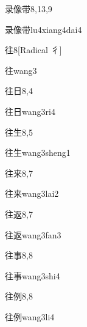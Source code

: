 \begin{entry}{录像带}{8,13,9}
  \begin{phonetics}{录像带}{lu4xiang4dai4}
  \end{phonetics}
\end{entry}

\begin{entry}{往}{8}[Radical 彳]
  \begin{phonetics}{往}{wang3}
  \end{phonetics}
\end{entry}

\begin{entry}{往日}{8,4}
  \begin{phonetics}{往日}{wang3ri4}
  \end{phonetics}
\end{entry}

\begin{entry}{往生}{8,5}
  \begin{phonetics}{往生}{wang3sheng1}
  \end{phonetics}
\end{entry}

\begin{entry}{往来}{8,7}
  \begin{phonetics}{往来}{wang3lai2}
  \end{phonetics}
\end{entry}

\begin{entry}{往返}{8,7}
  \begin{phonetics}{往返}{wang3fan3}
  \end{phonetics}
\end{entry}

\begin{entry}{往事}{8,8}
  \begin{phonetics}{往事}{wang3shi4}
  \end{phonetics}
\end{entry}

\begin{entry}{往例}{8,8}
  \begin{phonetics}{往例}{wang3li4}
  \end{phonetics}
\end{entry}

